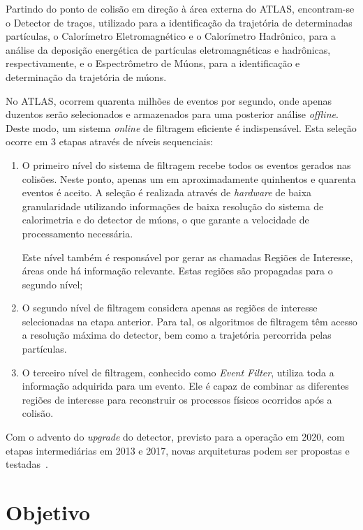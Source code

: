 Partindo do ponto de colisão em direção à área externa do ATLAS, encontram-se o
Detector de traços, utilizado para a identificação da trajetória de determinadas
partículas, o Calorímetro Eletromagnético e o Calorímetro Hadrônico, para a
análise da deposição energética de partículas eletromagnéticas e hadrônicas,
respectivamente, e o Espectrômetro de Múons, para a identificação
e determinação da trajetória de múons.

No ATLAS, ocorrem quarenta milhões de eventos por segundo, onde apenas duzentos
serão selecionados e armazenados para uma posterior análise \emph{offline}.
Deste modo, um sistema \emph{online} de filtragem eficiente é indispensável.
Esta seleção ocorre em 3 etapas através de níveis sequenciais:

\begin{enumerate}

    \item O primeiro nível do sistema de filtragem recebe todos os eventos
    gerados nas colisões. Neste ponto, apenas um em aproximadamente quinhentos e
    quarenta eventos é aceito.  A seleção é realizada através de \emph{hardware}
    de baixa granularidade utilizando informações de baixa resolução do sistema
    de calorimetria e do detector de múons, o que garante a velocidade de
    processamento necessária.

    Este nível também é responsável por gerar as chamadas Regiões de Interesse,
    áreas onde há informação relevante. Estas regiões são propagadas para o
    segundo nível;

    \item O segundo nível de filtragem considera apenas as regiões de interesse
    selecionadas na etapa anterior. Para tal, os algoritmos de filtragem têm
    acesso a resolução máxima do detector, bem como a trajetória percorrida
    pelas partículas.

    \item O terceiro nível de filtragem, conhecido como \emph{Event Filter},
    utiliza toda a informação adquirida para um evento. Ele é capaz de combinar
    as diferentes regiões de interesse para reconstruir os processos físicos
    ocorridos após a colisão.
\end{enumerate}

Com o advento do \emph{upgrade} do detector, previsto para a operação em 2020,
com etapas intermediárias em 2013 e 2017, novas arquiteturas podem ser propostas
e testadas~\cite{TSENG2008}.

\section{Objetivo}

